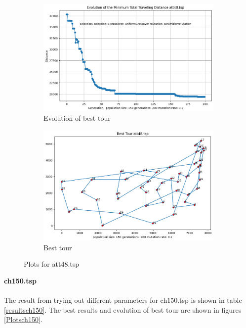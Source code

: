 \documentclass[12pt]{report}
\begin{document}
    \begin{figure}[H]
		\centering
		\begin{subfigure}{.5\textwidth}
			\centering
			\includegraphics[width=.99\linewidth]{../Results/att48/Evolution.png}
			\caption{Evolution of best tour}
			\label{Evolutionatt48}
		\end{subfigure}%
		\begin{subfigure}{.5\textwidth}
			\centering
			\includegraphics[width=.8\linewidth]{../Results/att48/bestTour.png}
			\caption{Best tour}
			\label{bestTouratt48}
		\end{subfigure}
		\caption{Plots for att48.tsp}
		\label{Plotsatt48}
	\end{figure}
    \newpage
    \noindent \textbf{ch150.tsp}\\
    \\
    The result from trying out different parameters for ch150.tsp is shown in table \ref{resultsch150}. The best results and evolution of best tour are shown in figures \ref{Plotsch150}.
\end{document}
